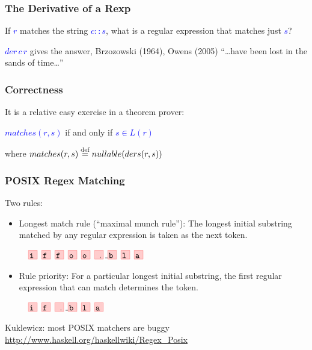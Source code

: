 \documentclass[dvipsnames,14pt,t]{beamer}
\newcommand{\bl}[1]{\textcolor{blue}{#1}}
\begin{document}
\begin{frame}[c]
\frametitle{The Derivative of a Rexp}

\large
If \bl{$r$} matches the string \bl{$c\!::\!s$}, what is a regular 
expression that matches just \bl{$s$}?\bigskip\bigskip\bigskip\bigskip

\small
\bl{$der\,c\,r$} gives the answer, Brzozowski (1964), Owens (2005)
``\ldots have been lost in the sands of time\ldots''
\end{frame}

\begin{frame}[c]
\frametitle{Correctness}

It is a relative easy exercise in a theorem prover:

\begin{center}
\bl{$matches(r, s)$}  if and only if  \bl{$s \in L(r)$} 
\end{center}\bigskip

\small
where \bl{$matches(r, s) \stackrel{\mbox{\scriptsize def}}{=} nullable(ders(r, s))$}

\end{frame}

\begin{frame}[c]
\frametitle{POSIX Regex Matching}

Two rules:

\begin{itemize}
\item Longest match rule (``maximal munch rule''): The 
longest initial substring matched by any regular expression 
is taken as the next token.

\begin{center}
\bl{$\texttt{\Grid{iffoo\VS bla}}$}
\end{center}\medskip

\item Rule priority:
For a particular longest initial substring, the first regular
expression that can match determines the token.

\begin{center}
\bl{$\texttt{\Grid{if\VS bla}}$}
\end{center}
\end{itemize}\bigskip\pause

\small
\hfill Kuklewicz: most POSIX matchers are buggy\\
\footnotesize
\hfill \url{http://www.haskell.org/haskellwiki/Regex_Posix}

\end{frame}
\end{document}
